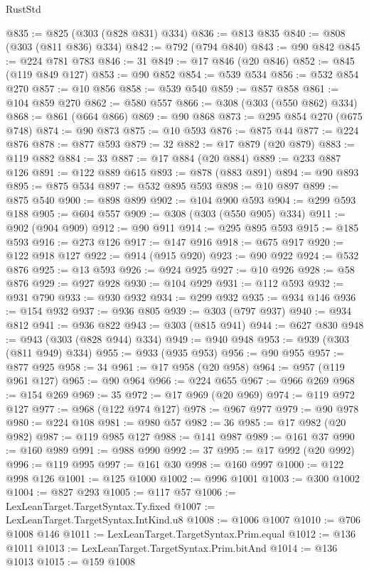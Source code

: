 \begin{lexlean}{RustStd}
\begin{coremodule}
@835 := @825 (@303 (@828 @831) @334)
@836 := @813 @835
@840 := @808 (@303 (@811 @836) @334)
@842 := @792 (@794 @840)
@843 := @90 @842
@845 := @224 @781 @783
@846 := 31
@849 := @17 @846 (@20 @846)
@852 := @845 (@119 @849 @127)
@853 := @90 @852
@854 := @539 @534
@856 := @532 @854 @270
@857 := @10 @856
@858 := @539 @540
@859 := @857 @858
@861 := @104 @859 @270
@862 := @580 @557
@866 := @308 (@303 (@550 @862) @334)
@868 := @861 (@664 @866)
@869 := @90 @868
@873 := @295 @854 @270 (@675 @748)
@874 := @90 @873
@875 := @10 @593
@876 := @875 @44
@877 := @224 @876
@878 := @877 @593
@879 := 32
@882 := @17 @879 (@20 @879)
@883 := @119 @882
@884 := 33
@887 := @17 @884 (@20 @884)
@889 := @233 @887 @126
@891 := @122 @889 @615
@893 := @878 (@883 @891)
@894 := @90 @893
@895 := @875 @534
@897 := @532 @895 @593
@898 := @10 @897
@899 := @875 @540
@900 := @898 @899
@902 := @104 @900 @593
@904 := @299 @593 @188
@905 := @604 @557
@909 := @308 (@303 (@550 @905) @334)
@911 := @902 (@904 @909)
@912 := @90 @911
@914 := @295 @895 @593
@915 := @185 @593
@916 := @273 @126
@917 := @147 @916
@918 := @675 @917
@920 := @122 @918 @127
@922 := @914 (@915 @920)
@923 := @90 @922
@924 := @532 @876
@925 := @13 @593
@926 := @924 @925
@927 := @10 @926
@928 := @58 @876
@929 := @927 @928
@930 := @104 @929
@931 := @112 @593
@932 := @931 @790
@933 := @930 @932
@934 := @299 @932
@935 := @934 @146
@936 := @154 @932
@937 := @936 @805
@939 := @303 (@797 @937)
@940 := @934 @812
@941 := @936 @822
@943 := @303 (@815 @941)
@944 := @627 @830
@948 := @943 (@303 (@828 @944) @334)
@949 := @940 @948
@953 := @939 (@303 (@811 @949) @334)
@955 := @933 (@935 @953)
@956 := @90 @955
@957 := @877 @925
@958 := 34
@961 := @17 @958 (@20 @958)
@964 := @957 (@119 @961 @127)
@965 := @90 @964
@966 := @224 @655
@967 := @966 @269
@968 := @154 @269
@969 := 35
@972 := @17 @969 (@20 @969)
@974 := @119 @972 @127
@977 := @968 (@122 @974 @127)
@978 := @967 @977
@979 := @90 @978
@980 := @224 @108
@981 := @980 @57
@982 := 36
@985 := @17 @982 (@20 @982)
@987 := @119 @985 @127
@988 := @141 @987
@989 := @161 @37
@990 := @160 @989
@991 := @988 @990
@992 := 37
@995 := @17 @992 (@20 @992)
@996 := @119 @995
@997 := @161 @30
@998 := @160 @997
@1000 := @122 @998 @126
@1001 := @125 @1000
@1002 := @996 @1001
@1003 := @300 @1002
@1004 := @827 @293
@1005 := @117 @57
@1006 := LexLeanTarget.TargetSyntax.Ty.fixed
@1007 := LexLeanTarget.TargetSyntax.IntKind.u8
@1008 := @1006 @1007
@1010 := @706 @1008 @146
@1011 := LexLeanTarget.TargetSyntax.Prim.equal
@1012 := @136 @1011
@1013 := LexLeanTarget.TargetSyntax.Prim.bitAnd
@1014 := @136 @1013
@1015 := @159 @1008

\end{coremodule}
\end{lexlean}
